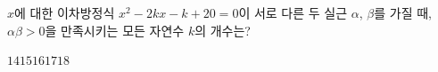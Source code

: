 $x$에 대한 이차방정식 $x^2-2kx-k+20=0$이 서로 다른 두 실근 $\alpha$, $\beta$를 가질 때, $\alpha\beta>0$을 만족시키는 모든 자연수 $k$의 개수는?
\begin{choices32}{$14$}{$15$}{$16$}{$17$}{$18$}\end{choices32}
